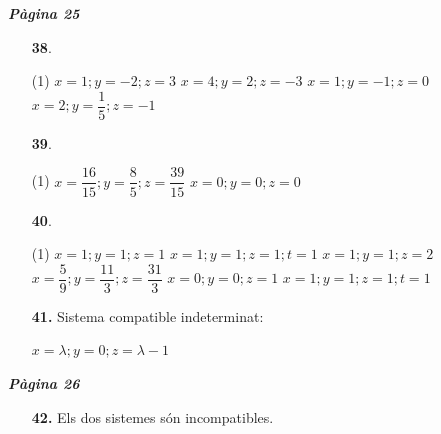 \documentclass[a4paper, pdf, twoside]{book}
\begin{document}
\begin{multicols}{2}

{\textbf{\em Pàgina 25}} \hrulefill
\begin{enumerate}
\vspace{0.25cm}



 \item[\fontfamily{phv}\selectfont\color{blue}\textbf{38}. ]  \scalebox{0.6}{\simbolclau } 
 \begin{tasks}[column-sep=1em, item-indent=1.3333em](1)
	 \task  $x=1; y=-2; z=3$
	 \task $x=4; y=2; z=-3$
	 \task $x=1; y=-1; z=0$
	 \task $x=2; y=\dfrac {1}{5}; z=-1$ 
\end{tasks}
 \end{enumerate}
\begin{enumerate}
\vspace{0.25cm}



 \item[\fontfamily{phv}\selectfont\color{blue}\textbf{39}. ] 
 \begin{tasks}[column-sep=1em, item-indent=1.3333em](1)
	 \task*  $x=\dfrac {16}{15}; y=\dfrac {8}{5}; z=\dfrac {39}{15}$
	 \task $x=0; y=0; z=0$ 
\end{tasks}
\vspace{0.25cm}



 \item[\fontfamily{phv}\selectfont\color{blue}\textbf{40}. ] 
 \begin{tasks}[column-sep=1em, item-indent=1.3333em](1)
	 \task  $x=1; y=1; z=1$
	 \task $x=1; y=1; z=1; t=1$
	 \task $x=1; y=1; z=2$
	 \task* $x=\dfrac {5}{9}; y=\dfrac {11}{3}; z=\dfrac {31}{3}$
	 \task $x=0; y=0; z=1$
	 \task $x=1; y=1; z=1; t=1$ 
\end{tasks}
\vspace{0.25cm}
\item[\fontfamily{phv}\selectfont\color{blue}\textbf{41. }] 
Sistema compatible indeterminat:\par $x=\lambda ; y=0; z=\lambda -1$
 \end{enumerate}
\vspace{0.3cm}


{\textbf{\em Pàgina 26}} \hrulefill
\begin{enumerate}
\vspace{0.25cm}
\item[\fontfamily{phv}\selectfont\color{blue}\textbf{42. }] 
Els dos sistemes són incompatibles.
 \end{enumerate}
\begin{enumerate}
\vspace{0.25cm}



\end{enumerate}
\end{multicols}
\end{document}
